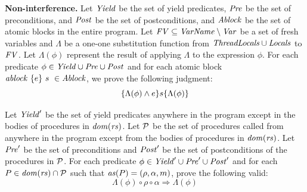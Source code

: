 {\bf Non-interference.}
Let $\mathit{Yield}$ be the set of yield predicates, $\mathit{Pre}$ be the set of preconditions,
and $\mathit{Post}$ be the set of postconditions, and $\mathit{Ablock}$ be the set of atomic blocks in the entire program.
Let $\mathit{FV} \subseteq \mathit{VarName} \setminus \mathit{Var}$ be a set of fresh variables and $\Lambda$ be a one-one 
substitution function from $\mathit{ThreadLocals} \cup \mathit{Locals}$ to $\mathit{FV}$.
Let $\Lambda(\phi)$ represent the result of applying $\Lambda$ to the expression $\phi$.
For each predicate $\phi \in \mathit{Yield} \cup \mathit{Pre} \cup \mathit{Post}$
and for each atomic block $\mathit{ablock}\ {\{e\}}\ {s}\  \in \mathit{Ablock}$, we prove the following judgment:
\[
\{\Lambda(\phi) \wedge e\} s \{\Lambda(\phi)\}
\]

Let $\mathit{Yield}'$ be the set of yield predicates anywhere in the program except in the bodies of procedures
in  $\mathit{dom}(\mathit{rs})$.
Let ${\cal P}$ be the set of procedures called from anywhere in the program except from the bodies of 
procedures in $\mathit{dom}(\mathit{rs})$.
Let $\mathit{Pre}'$ be the set of preconditions and $\mathit{Post}'$ be the set of postconditions of the procedures in ${\cal P}$.
For each predicate $\phi \in \mathit{Yield}' \cup \mathit{Pre}' \cup \mathit{Post}'$ and for each $P \in \mathit{dom}(\mathit{rs}) \cap {\cal P}$ such that
$\mathit{as}(P) = (\rho, \alpha, m)$, prove the following valid:
\[
\Lambda(\phi) \circ \rho \circ \alpha \Rightarrow \Lambda(\phi)
\]

